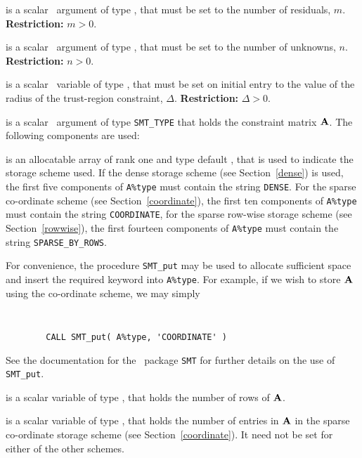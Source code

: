 \documentclass{galahad}
\begin{document}
\begin{description}

 is a scalar \intentin\ argument of type \integer, that must be
set to the number of residuals, $m$. {\bf Restriction: } $m  >  0$.

 is a scalar \intentin\ argument of type \integer, that must be
set to the number of unknowns, $n$. {\bf Restriction: } $n  >  0$.

 is a scalar \intentin\ variable of type \realdp,
that must be set on initial entry
to the value of the radius of the trust-region constraint, $\Delta$.
{\bf Restriction: } $\Delta > 0$.

 is a scalar \intentin\ argument of type {\tt SMT\_TYPE}
that holds the constraint matrix ${\mathbf{A}}$. The following components are used:

\begin{description}

 is an allocatable array of rank one and type default
\character, that
is used to indicate the storage scheme used. If the dense storage scheme
(see Section~\ref{dense}) is used,
the first five components of {\tt A\%type} must contain the
string {\tt DENSE}.
For the sparse co-ordinate scheme (see Section~\ref{coordinate}),
the first ten components of {\tt A\%type} must contain the
string {\tt COORDINATE},
for the sparse row-wise storage scheme (see Section~\ref{rowwise}),
the first fourteen components of {\tt A\%type} must contain the
string {\tt SPARSE\_BY\_ROWS}.

For convenience, the procedure {\tt SMT\_put}
may be used to allocate sufficient space and insert the required keyword
into {\tt A\%type}.
For example, if we wish to store ${\mathbf{A}}$ using the co-ordinate scheme,
we may simply
{\tt
\begin{verbatim}
        CALL SMT_put( A%type, 'COORDINATE' )
\end{verbatim}
}
\noindent
See the documentation for the \galahad\ package {\tt SMT}
for further details on the use of {\tt SMT\_put}.

 is a scalar variable of type \integer, that
holds the number of rows of ${\mathbf{A}}$.

 is a scalar variable of type \integer, that
holds the number of entries in ${\mathbf{A}}$
in the sparse co-ordinate storage scheme (see Section~\ref{coordinate}).
It need not be set for either of the other schemes.


\end{description}
\end{description}
\end{document}
